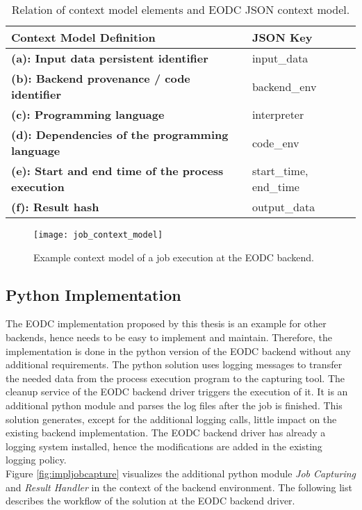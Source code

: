 \documentclass[draft,final]{vutinfth} %
\begin{document}
\begin{table}[]
	\caption{Relation of context model elements and EODC JSON context model.}
	\begin{tabular}{l|l}
		\textbf{Context Model Definition} & \textbf{JSON Key} \\ \hline
		\textbf{(a): Input data persistent identifier} & input\_data \\ \hline
		\textbf{(b): Backend provenance / code identifier} & backend\_env \\ \hline
		\textbf{(c): Programming language} & interpreter \\ \hline
		\textbf{(d): Dependencies of the programming language} & code\_env \\ \hline
		\textbf{(e): Start and end time of the process execution} & start\_time, end\_time \\ \hline
		\textbf{(f): Result hash} & output\_data \\ %
	\end{tabular}
\label{Tab:contextmodel}
\end{table}

\begin{figure}[h]
	\centering
	\texttt{[image: job\_context\_model]}
	\caption{Example context model of a job execution at the EODC backend.}
	\label{fig:job_context_model} %
\end{figure}

\subsection{Python Implementation}\label{Implementation:Python Implementation}
The EODC implementation proposed by this thesis is an example for other backends, hence needs to be easy to implement and maintain. Therefore, the implementation is done in the python version of the EODC backend without any additional requirements. The python solution uses logging messages to transfer the needed data from the process execution program to the capturing tool. The cleanup service of the EODC backend driver triggers the execution of it. It is an additional python module and parses the log files after the job is finished. This solution generates, except for the additional logging calls, little impact on the existing backend implementation. The EODC backend driver has already a logging system installed, hence the modifications are added in the existing logging policy. \\
Figure \ref{fig:impljobcapture} visualizes the additional python module \textit{Job Capturing} and \textit{Result Handler} in the context of the backend environment. The following list describes the workflow of the solution at the EODC backend driver. 
\end{document}
